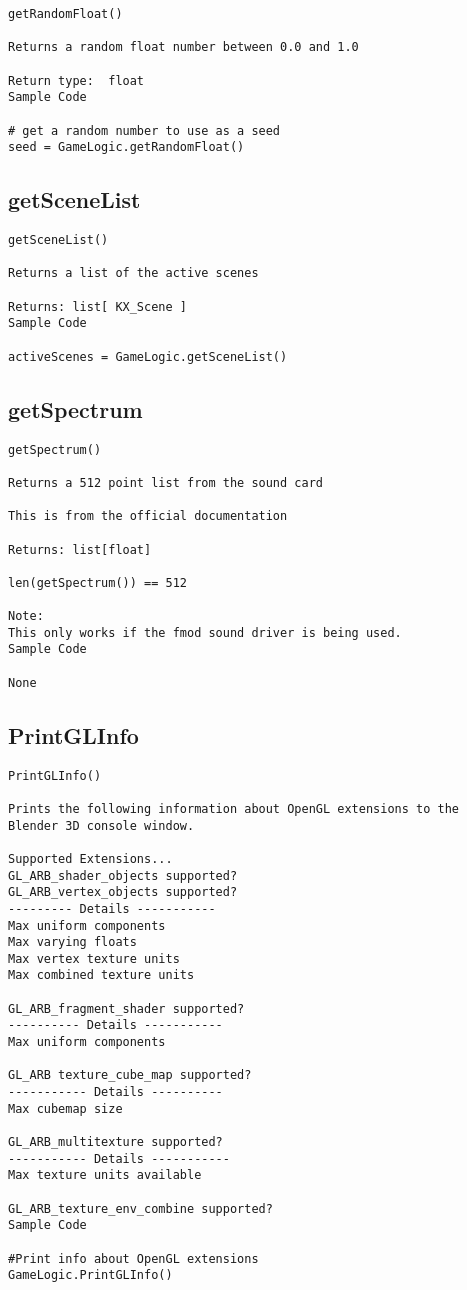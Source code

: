 \begin{verbatim}
getRandomFloat()

Returns a random float number between 0.0 and 1.0

Return type:  float
Sample Code

# get a random number to use as a seed
seed = GameLogic.getRandomFloat()
\end{verbatim}

\subsection{getSceneList}
\begin{verbatim}
getSceneList()

Returns a list of the active scenes

Returns: list[ KX_Scene ]
Sample Code

activeScenes = GameLogic.getSceneList()
\end{verbatim}

\subsection{getSpectrum}
\begin{verbatim}
getSpectrum()

Returns a 512 point list from the sound card

This is from the official documentation

Returns: list[float]

len(getSpectrum()) == 512

Note:
This only works if the fmod sound driver is being used.
Sample Code

None
\end{verbatim}

\subsection{PrintGLInfo}
\begin{verbatim}
PrintGLInfo()

Prints the following information about OpenGL extensions to the Blender 3D console window.

Supported Extensions...
GL_ARB_shader_objects supported?
GL_ARB_vertex_objects supported?
--------- Details -----------
Max uniform components
Max varying floats
Max vertex texture units
Max combined texture units

GL_ARB_fragment_shader supported?
---------- Details -----------
Max uniform components

GL_ARB texture_cube_map supported?
----------- Details ----------
Max cubemap size

GL_ARB_multitexture supported?
----------- Details -----------
Max texture units available

GL_ARB_texture_env_combine supported?
Sample Code

#Print info about OpenGL extensions
GameLogic.PrintGLInfo()
\end{verbatim}


